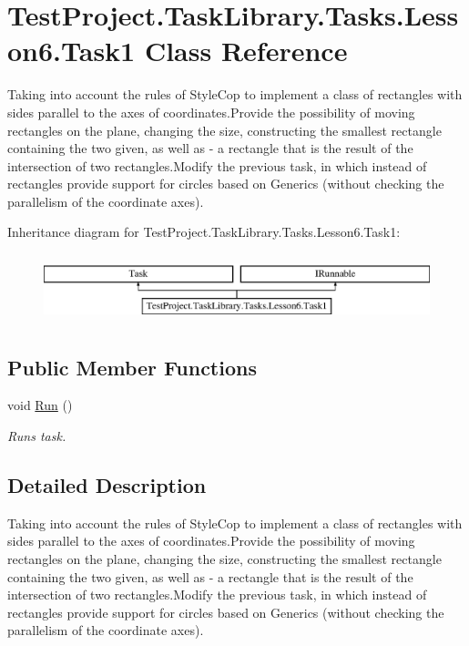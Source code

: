 \hypertarget{class_test_project_1_1_task_library_1_1_tasks_1_1_lesson6_1_1_task1}{}\section{Test\+Project.\+Task\+Library.\+Tasks.\+Lesson6.\+Task1 Class Reference}
\label{class_test_project_1_1_task_library_1_1_tasks_1_1_lesson6_1_1_task1}


Taking into account the rules of Style\+Cop to implement a class of rectangles with sides parallel to the axes of coordinates.\+Provide the possibility of moving rectangles on the plane, changing the size, constructing the smallest rectangle containing the two given, as well as -\/ a rectangle that is the result of the intersection of two rectangles.\+Modify the previous task, in which instead of rectangles provide support for circles based on Generics (without checking the parallelism of the coordinate axes).  


Inheritance diagram for Test\+Project.\+Task\+Library.\+Tasks.\+Lesson6.\+Task1\+:\begin{figure}[H]
\begin{center}
\leavevmode
\includegraphics[height=2.000000cm]{class_test_project_1_1_task_library_1_1_tasks_1_1_lesson6_1_1_task1}
\end{center}
\end{figure}
\subsection*{Public Member Functions}
\begin{DoxyCompactItemize}
\item 
void \mbox{\hyperlink{class_test_project_1_1_task_library_1_1_tasks_1_1_lesson6_1_1_task1_a202ebb10a00bab473580af0b1ee5d4ae}{Run}} ()
\begin{DoxyCompactList}\small\item\em Runs task. \end{DoxyCompactList}\end{DoxyCompactItemize}


\subsection{Detailed Description}
Taking into account the rules of Style\+Cop to implement a class of rectangles with sides parallel to the axes of coordinates.\+Provide the possibility of moving rectangles on the plane, changing the size, constructing the smallest rectangle containing the two given, as well as -\/ a rectangle that is the result of the intersection of two rectangles.\+Modify the previous task, in which instead of rectangles provide support for circles based on Generics (without checking the parallelism of the coordinate axes). 



